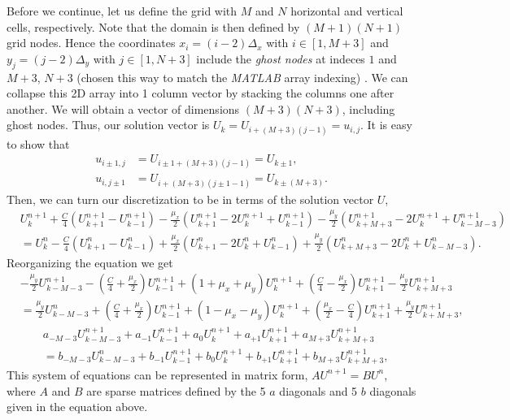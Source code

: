 \begin{questions}
\begin{solution}
Before we continue, let us define the grid with $M$ and $N$ horizontal and vertical cells, respectively. Note that the domain is then defined by $(M+1)(N+1)$ grid nodes. Hence the coordinates $x_i = (i-2)\Delta_x$ with $i\in[1,M+3]$ and $y_j = (j-2)\Delta_y$ with $j\in[1,N+3]$ include the \textit{ghost nodes} at indeces $1$ and $M+3$, $N+3$ (chosen this way to match the \textsl{MATLAB} array indexing) . We can collapse this 2D array into 1 column vector by stacking the columns one after another. We will obtain a vector of dimensions $(M+3)(N+3)$, including ghost nodes. Thus, our solution vector is $U_k = U_{i+(M+3)(j-1)} = u_{i,j}$. It is easy to show that
\begin{align*}
u_{i\pm 1,j} &= U_{i\pm 1+(M+3)(j-1)} = U_{k\pm 1},\\
u_{i,j\pm 1} &= U_{i+(M+3)(j\pm 1-1)} = U_{k\pm (M+3)}.
\end{align*}
Then, we can turn our discretization to be in terms of the solution vector $U$,
\begin{align*}
&U_k^{n+1} + \frac{C}{4}\left( U_{k+1}^{n+1} - U_{k-1}^{n+1} \right) - \frac{\mu_x}{2}\left( U_{k+1}^{n+1} -2U_{k}^{n+1} + U_{k-1}^{n+1} \right) - \frac{\mu_y}{2}\left( U_{k+M+3}^{n+1} -2U_{k}^{n+1} + U_{k-M-3}^{n+1} \right) \\
& = U_{k}^{n} - \frac{C}{4}\left( U_{k+1}^{n} - U_{k-1}^{n} \right) + \frac{\mu_x}{2}\left( U_{k+1}^{n} -2U_{k}^{n} + U_{k-1}^{n} \right) + \frac{\mu_y}{2}\left( U_{k+M+3}^{n} -2U_{k}^{n} + U_{k-M-3}^{n} \right).
\end{align*}
Reorganizing the equation we get
\begin{align*}
&- \frac{\mu_y}{2}U_{k-M-3}^{n+1} - \left(\frac{C}{4}+\frac{\mu_x}{2}\right)U_{k-1}^{n+1} + \left(1 + \mu_x + \mu_y\right)U_{k}^{n+1} + \left(\frac{C}{4}-\frac{\mu_x}{2}\right)U_{k+1}^{n+1} - \frac{\mu_y}{2}U_{k+M+3}^{n+1}\\
& = \frac{\mu_y}{2}U_{k-M-3}^{n} + \left(\frac{C}{4}+\frac{\mu_x}{2}\right)U_{k-1}^{n+1} + \left(1 - \mu_x - \mu_y\right)U_{k}^{n+1} + \left(\frac{\mu_x}{2}-\frac{C}{4}\right)U_{k+1}^{n+1} + \frac{\mu_y}{2}U_{k+M+3}^{n+1},
\end{align*}
\begin{align*}
&a_{-M-3}U_{k-M-3}^{n+1} + a_{-1}U_{k-1}^{n+1} + a_{0}U_{k}^{n+1} + a_{+1}U_{k+1}^{n+1} +a_{M+3}U_{k+M+3}^{n+1}\\
& = b_{-M-3}U_{k-M-3}^{n} + b_{-1}U_{k-1}^{n+1} + b_{0}U_{k}^{n+1} + b_{+1}U_{k+1}^{n+1} + b_{M+3}U_{k+M+3}^{n+1},
\end{align*}
This system of equations can be represented in matrix form, $AU^{n+1}=BU^{n}$, where $A$ and $B$ are sparse matrices defined by the 5 $a$ diagonals and 5 $b$ diagonals given in the equation above.

\end{solution}
\end{questions}

